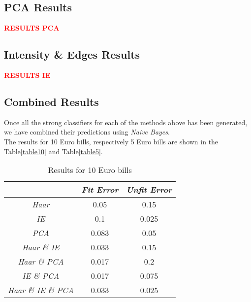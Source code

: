 \documentclass[11pt,twocolumn]{article}
\newcommand{\todo}[1]{\textcolor{red}{\textbf{#1}}}
\begin{document}
		\subsection{PCA Results}\label{sec:pca_results}
			\todo{RESULTS PCA}
	
		\subsection{Intensity \& Edges Results}\label{sec:ie_results}
			\todo{RESULTS IE}
	
		\subsection{Combined Results}\label{sec:comb_results}
			\hspace*{10px}Once all the strong classifiers for each of the methods above
			has been generated, we have combined their predictions using \emph{Naive
			Bayes}.\\ 
			\hspace*{10px}The results for 10 Euro bills, respectively 5 Euro bills are
			shown in the Table\ref{table10} and Table\ref{table5}. 
			\begin{table}[!htbp]
				\caption{Results for 10 Euro bills}
				\selectfont\small
				\label{table10}
				\centering 
				\begin{tabular}{ | c | c | c|}
					\hline\hline & \emph{Fit Error} & \emph{Unfit Error} \\ [0.5ex]\hline 
					\emph{Haar} & 0.05 & 0.15 \\ [0.5ex]\hline
					\emph{IE} & 0.1 & 0.025 \\ [0.5ex]\hline
					\emph{PCA} & 0.083 & 0.05 \\ [0.5ex]\hline
					\emph{Haar \& IE} & 0.033 & 0.15 \\ [0.5ex]\hline
					\emph{Haar \& PCA} & 0.017 & 0.2 \\ [0.5ex]\hline
					\emph{IE \& PCA} & 0.017 & 0.075 \\ [0.5ex]\hline
					\emph{Haar \& IE \& PCA} & 0.033 & 0.025 \\ [0.5ex]\hline
				\end{tabular} 
				\label{table:nonlin10eur} 
			\end{table}		
\end{document}
